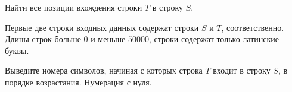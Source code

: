 Найти все позиции вхождения строки $T$ в строку $S$.

\InputFile

Первые две строки входных данных содержат строки $S$ и $T$, соответственно. Длины
строк больше $0$ и меньше $50000$, строки содержат только латинские буквы.

\OutputFile

Выведите номера символов, начиная с которых строка $T$ входит в строку $S$,
в порядке возрастания. Нумерация с нуля.

\SAMPLES
